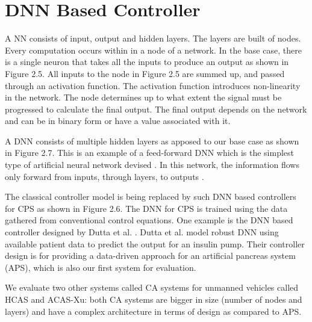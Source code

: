 \section{DNN Based Controller}
\label{apsdnn}


A \ac{NN} consists of input, output and hidden layers. 
The layers are built of nodes. Every computation occurs within in a node of a network.
In the base case, there is a single neuron that takes all the inputs to produce an output as shown in Figure 2.5. 
All inputs to the node in Figure 2.5 are summed up, and  passed through an activation function. 
The activation function introduces non-linearity in the network. 
The node determines up to what extent the signal must be progressed to calculate the final output. 
The final output depends on the network and can be in binary form or have a value associated with it. 


A \ac{DNN} consists of multiple hidden layers as apposed to our base case  as shown in Figure 2.7.
This is an example of a feed-forward \ac{DNN} which is the simplest type of artificial neural network devised \cite{feedforward}.
In this network, the information flows only forward from inputs, through layers, to outputs \cite{Zell}. 

The classical controller model is being replaced by such DNN based controllers for CPS as shown in  Figure 2.6.
The \ac{DNN} for \ac*{CPS} is trained using the data gathered from conventional control equations. 
One example is the DNN based controller designed by Dutta et al. \cite{Dutta_Others__2018__Robust}. 
Dutta et al. model robust DNN using available patient data to predict the output for an insulin pump.
Their controller design is for providing a data-driven approach for an artificial pancreas system (APS), which is also our first system for evaluation. 

We evaluate two other systems called \ac{CA} systems for unmanned vehicles \cite{7778055} called \ac{HCAS} and \ac{ACAS-Xu}: both \ac{CA} systems are bigger in size (number of nodes and layers) and have a complex architecture in terms of design as compared to \ac{APS}.


